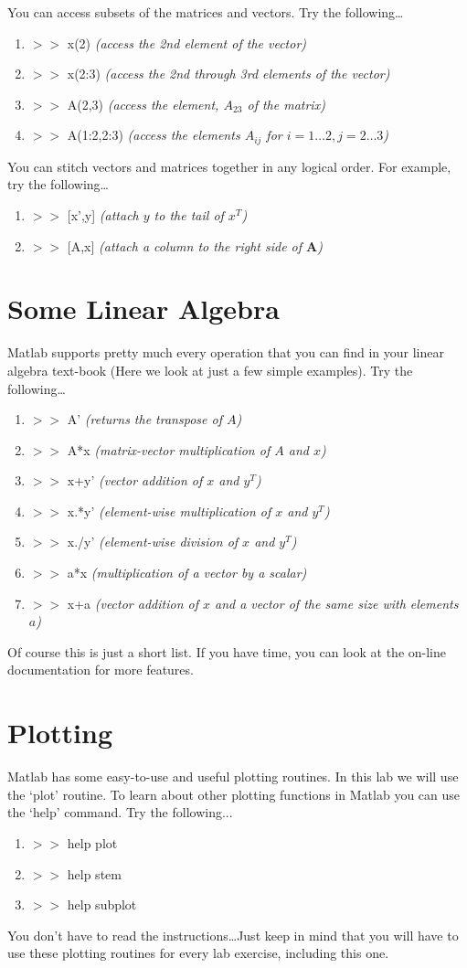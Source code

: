 \documentclass[letter]{article}
\begin{document}
You can access subsets of the matrices and vectors.  Try the
following\ldots
\begin{enumerate}
\item $>>$ x(2) \emph{(access the 2nd element of the vector)}
\item $>>$ x(2:3) \emph{(access the 2nd through 3rd elements of the vector)}
\item $>>$ A(2,3) \emph{(access the element, $A_{23}$ of the matrix)}
\item $>>$ A(1:2,2:3) \emph{(access the elements $A_{ij}$ for
$i=1\ldots 2, j=2\ldots3$)} 
\end{enumerate}

You can stitch vectors and matrices together in any logical
order.  For example, try the following\ldots
\begin{enumerate}
\item $>>$ [x',y] \emph{(attach $y$ to the tail of $x^T$)}
\item $>>$ [A,x] \emph{(attach a column to the right side of $\mathbf{A}$)}
\end{enumerate}
\section*{Some Linear Algebra}
Matlab supports pretty much every operation that you can find in your
linear algebra text-book (Here we look at just a few simple
examples).  Try the following\ldots
\begin{enumerate}
\item $>>$ A' \emph{(returns the transpose of $A$)}
\item $>>$ A*x \emph{(matrix-vector multiplication of $A$ and $x$)}
\item $>>$ x+y' \emph{(vector addition of $x$ and $y^T$)}
\item $>>$ x.*y' \emph{(element-wise multiplication of $x$ and $y^T$)}
\item $>>$ x./y' \emph{(element-wise division of $x$ and $y^T$)}
\item $>>$ a*x \emph{(multiplication of a vector by a scalar)}
\item $>>$ x+a \emph{(vector addition of $x$ and a vector of the same
size with elements $a$)}
\end{enumerate}
Of course this is just a short list.  If you have time, you can look
at the on-line documentation for more features.

\section*{Plotting}
Matlab has some easy-to-use and useful plotting routines.  In this lab we will
use the `plot' routine.  To learn about other plotting functions in
Matlab you can use the `help' command.  Try the following...
\begin{enumerate}
\item $>>$ help plot
\item $>>$ help stem
\item $>>$ help subplot
\end{enumerate}
You don't have to read the instructions\ldots Just keep in mind that
you will have to use these plotting routines for every lab exercise,
including this one.
\end{document}

